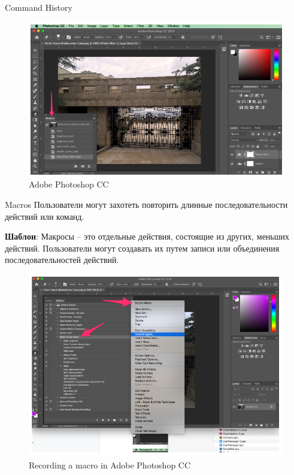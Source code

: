 \documentclass{beamer}
\begin{document}
\begin{frame}[t]{Command History}
	\begin{figure}[h]
		\centering
		\includegraphics[scale=0.5]{images/lec08-pic26.png}
		\caption{Adobe Photoshop CC}
	\end{figure}
\end{frame}

\begin{frame}[t]{Macros}
	Пользователи могут захотеть повторить длинные последовательности действий или команд.
	
	\textbf{Шаблон}: Макросы -- это отдельные действия, состоящие из других, меньших действий. Пользователи могут создавать их путем записи или объединения последовательностей действий.
	\begin{figure}[h]
		\centering
		\includegraphics[scale=0.35]{images/lec08-pic27.png}
		\caption{Recording a macro in Adobe Photoshop CC}
	\end{figure}
\end{frame}
\end{document}
